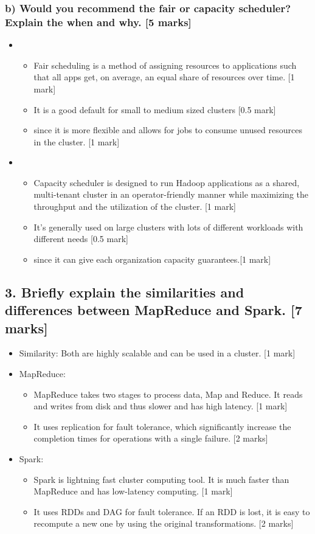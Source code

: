 \documentclass[11pt,a4paper]{article}
\begin{document}
\subsubsection*{b) Would you recommend the fair or capacity scheduler? Explain the when and why. [5 marks]}
\begin{itemize}
\item
\begin{itemize}
\item Fair scheduling is a method of assigning resources to applications such that all apps get, on average, an equal share of resources over time. [1 mark]
\item It is a good default for small to medium sized clusters [0.5 mark]
\item since it is more flexible and allows for jobs to consume unused resources in the cluster. [1 mark]
\end{itemize}
\item
\begin{itemize}
\item Capacity scheduler is designed to run Hadoop applications as a shared, multi-tenant cluster in an operator-friendly manner while maximizing the throughput and the utilization of the cluster. [1 mark]
\item It's generally used on large clusters with lots of different workloads with different needs [0.5 mark]
\item since it can give each organization capacity guarantees.[1 mark]
\end{itemize}
\end{itemize}

\subsection*{3. Briefly explain the similarities and differences between MapReduce and Spark. [7 marks]}

\begin{itemize}
\item Similarity: Both are highly scalable and can be used in a cluster. [1 mark]
\item MapReduce: 
\begin{itemize}
\item MapReduce takes two stages to process data, Map and Reduce. It reads and writes from disk and thus slower and has high latency. [1 mark]
\item It uses replication for fault tolerance, which significantly increase the completion times for operations with a single failure. [2 marks]
\end{itemize}
\item Spark: 
\begin{itemize}
\item
Spark is lightning fast cluster computing tool. It is much faster than MapReduce and has low-latency computing. [1 mark] 
\item
It uses RDDs and DAG for fault tolerance. If an RDD is lost, it is easy to recompute a new one by using the original transformations. [2 marks]
\end{itemize}
\end{itemize}
\end{document}
